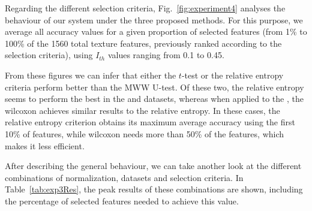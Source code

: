 Regarding the different selection criteria, Fig.~\ref{fig:experiment4} analyses the behaviour of our system under the three proposed methods. For this purpose, we average all accuracy values for a given proportion of selected features (from 1\% to 100\% of the 1560 total texture features, previously ranked according to the selection criteria), using $I_{th}$ values ranging from 0.1 to 0.45. 

From these figures we can infer that either the $t$-test or the relative entropy criteria perform better than the \ac{MWW} U-test. Of these two, the relative entropy seems to perform the best in the \ppmidat{} and \vdlvdat{}{} datasets, whereas when applied to the \vdlvdat{}, the wilcoxon achieves similar results to the relative entropy. In these cases, the relative entropy criterion obtains its maximum average accuracy using the first 10\% of features, while wilcoxon needs more than 50\% of the features, which makes it less efficient. 

After describing the general behaviour, we can take another look at the different combinations of normalization, datasets and selection criteria. In Table~\ref{tab:exp3Res}, the peak results of these combinations are shown, including the percentage of selected features needed to achieve this value. 

